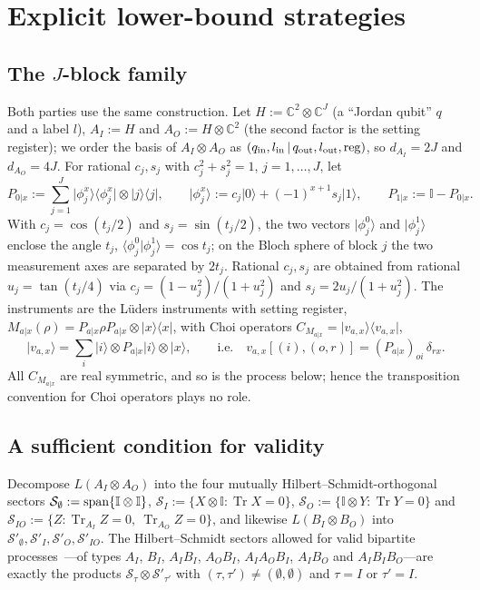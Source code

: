 \documentclass[aps,pra,onecolumn,notitlepage,superscriptaddress,longbibliography,nofootinbib,11pt]{revtex4-2}
\theoremstyle{remark}
\newcommand{\Tr}{\operatorname{Tr}}
\newcommand{\ket}[1]{\lvert #1\rangle}
\newcommand{\bra}[1]{\langle #1\rvert}
\newcommand{\one}{\mathbb{I}}
\newcommand{\CC}{\mathbb{C}}
\begin{document}
\section{Explicit lower-bound strategies}\label{sec:strategies}

\subsection{The $J$-block family}

Both parties use the same construction. Let $H:=\CC^2\otimes\CC^J$ (a ``Jordan qubit'' $q$ and a label $l$), $A_I:=H$ and $A_O:=H\otimes\CC^2$ (the second factor is the setting register); we order the basis of $A_I\otimes A_O$ as $(q_{\rm in},l_{\rm in}\,|\,q_{\rm out},l_{\rm out},{\rm reg})$, so $d_{A_I}=2J$ and $d_{A_O}=4J$. For rational $c_j,s_j$ with $c_j^2+s_j^2=1$, $j=1,\dots,J$, let
\begin{equation}
P_{0|x}:=\sum_{j=1}^J\ket{\phi_j^x}\bra{\phi_j^x}\otimes\ket{j}\bra{j},\qquad
\ket{\phi_j^x}:=c_j\ket{0}+(-1)^{x+1}s_j\ket{1},\qquad P_{1|x}:=\one-P_{0|x}.
\end{equation}
With $c_j=\cos(t_j/2)$ and $s_j=\sin(t_j/2)$, the two vectors $\ket{\phi_j^0}$ and $\ket{\phi_j^1}$ enclose the angle $t_j$, $\langle\phi_j^0|\phi_j^1\rangle=\cos t_j$; on the Bloch sphere of block $j$ the two measurement axes are separated by $2t_j$. Rational $c_j,s_j$ are obtained from rational $u_j=\tan(t_j/4)$ via $c_j=(1-u_j^2)/(1+u_j^2)$ and $s_j=2u_j/(1+u_j^2)$. The instruments are the L\"uders instruments with setting register, $M_{a|x}(\rho)=P_{a|x}\rho P_{a|x}\otimes\ket{x}\bra{x}$, with Choi operators $C_{M_{a|x}}=\ket{v_{a,x}}\bra{v_{a,x}}$,
\begin{equation}
\ket{v_{a,x}}=\sum_i\ket{i}\otimes P_{a|x}\ket{i}\otimes\ket{x},\qquad\text{i.e.}\quad v_{a,x}[(i),(o,r)]=(P_{a|x})_{oi}\,\delta_{rx}.
\end{equation}
All $C_{M_{a|x}}$ are real symmetric, and so is the process below; hence the transposition convention for Choi operators plays no role.

\subsection{A sufficient condition for validity}

Decompose $L(A_I\otimes A_O)$ into the four mutually Hilbert--Schmidt-orthogonal sectors $\mathcal S_\emptyset:={\rm span}\{\one\otimes\one\}$, $\mathcal S_I:=\{X\otimes\one:\Tr X=0\}$, $\mathcal S_O:=\{\one\otimes Y:\Tr Y=0\}$ and $\mathcal S_{IO}:=\{Z:\Tr_{A_I}Z=0,\ \Tr_{A_O}Z=0\}$, and likewise $L(B_I\otimes B_O)$ into $\mathcal S'_\emptyset,\mathcal S'_I,\mathcal S'_O,\mathcal S'_{IO}$. The Hilbert--Schmidt sectors allowed for valid bipartite processes~\cite{Oreshkov2012,Araujo2015}---of types $A_I$, $B_I$, $A_IB_I$, $A_OB_I$, $A_IA_OB_I$, $A_IB_O$ and $A_IB_IB_O$---are exactly the products $\mathcal S_\tau\otimes\mathcal S'_{\tau'}$ with $(\tau,\tau')\neq(\emptyset,\emptyset)$ and $\tau=I$ or $\tau'=I$.
\end{document}
